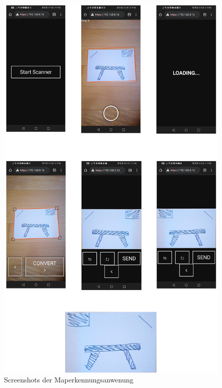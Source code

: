 \begin{figure}[H]
  \centering
  \includegraphics[scale=0.4]{pics/demo_maperkennung/sammlung_1.png}
  \caption{Screenshots der Maperkennungsanwenung}
  \label{fig:map:maperkennungsprozess}
\end{figure}

